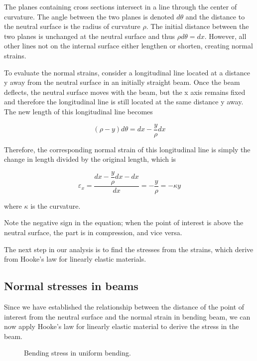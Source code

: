 \documentclass[
10pt,
a4paper,
openany,
svgnames,
]{book} %
\begin{document}
The planes containing cross sections intersect in a line through the center of curvature. The angle between the two planes is denoted $d\theta$ and the distance to the neutral surface is the radius of curvature $\rho$. The initial distance between the two planes is unchanged at the neutral surface and thus $\rho d \theta = dx$. However, all other lines not on the internal surface either lengthen or shorten, creating normal strains.

To evaluate the normal strains, consider a longitudinal line located at a
distance y away from the neutral surface in an initially straight beam. Once the beam deflects, the neutral surface moves with the beam, but the x axis remains fixed and therefore the longitudinal line is still located at the same distance y away. The new length of this longitudinal line becomes

\[(\rho  - y)d\theta  = dx - \dfrac{y}{\rho }dx\]

Therefore, the corresponding normal strain of this longitudinal line is simply the change in length divided by the original length, which is

\begin{equation}
  {\varepsilon _x} = \frac{{dx - \dfrac{y}{\rho }dx - dx}}{{dx}} =  - \dfrac{y}{\rho } =  - \kappa y
\end{equation}

where $\kappa$ is the curvature.

Note the negative sign in the equation; when the point of interest is above the neutral surface, the part is in compression, and vice versa.

The next step in our analysis is to find the stresses from the strains, which derive from Hooke’s law for linearly elastic materials.

\subsection{Normal stresses in beams}

Since we have established the relationship between the distance of the point of interest from the neutral surface and the normal strain in bending beam, we can now apply Hooke’s law for linearly elastic material to derive the stress in the beam.

\begin{figure}[h]
  \centering
  \caption{Bending stress in uniform bending.}
\end{figure}
\end{document}
